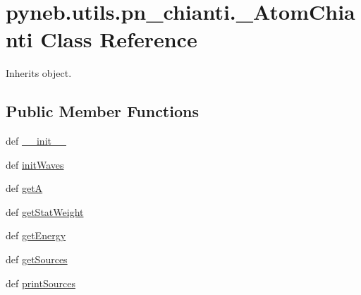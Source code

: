 \hypertarget{classpyneb_1_1utils_1_1pn__chianti_1_1___atom_chianti}{\section{pyneb.\-utils.\-pn\-\_\-chianti.\-\_\-\-Atom\-Chianti Class Reference}
\label{classpyneb_1_1utils_1_1pn__chianti_1_1___atom_chianti}
}


Inherits object.

\subsection*{Public Member Functions}
\begin{DoxyCompactItemize}
\item 
def \hyperlink{classpyneb_1_1utils_1_1pn__chianti_1_1___atom_chianti_accfb95c4b9bdc734c43e40cc5d21c5c1}{\-\_\-\-\_\-init\-\_\-\-\_\-}
\item 
def \hyperlink{classpyneb_1_1utils_1_1pn__chianti_1_1___atom_chianti_a7a801384a2639d7428f8c3b4a09cd0a7}{init\-Waves}
\item 
def \hyperlink{classpyneb_1_1utils_1_1pn__chianti_1_1___atom_chianti_aed967b738fd8c3d9ebef843f71d7063e}{get\-A}
\item 
def \hyperlink{classpyneb_1_1utils_1_1pn__chianti_1_1___atom_chianti_a6a02beb861a01f6349a3cd87681491f0}{get\-Stat\-Weight}
\item 
def \hyperlink{classpyneb_1_1utils_1_1pn__chianti_1_1___atom_chianti_adfaee032bacec747d8a1573968d0ebf1}{get\-Energy}
\item 
def \hyperlink{classpyneb_1_1utils_1_1pn__chianti_1_1___atom_chianti_a3af16a6fe22a1c2e8167dbc59c81092c}{get\-Sources}
\item 
def \hyperlink{classpyneb_1_1utils_1_1pn__chianti_1_1___atom_chianti_ab50936935bf2d84a9fb8b9af705afd38}{print\-Sources}
\end{DoxyCompactItemize}

